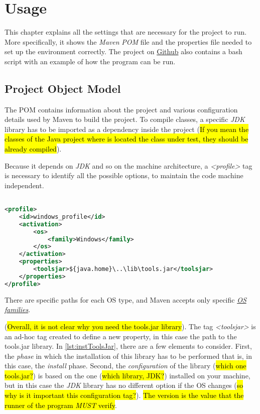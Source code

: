 \chapter{Usage}\label{ch:usage}

This chapter explains all the settings that are necessary for the project to run. More specifically, it shows the \textit{Maven} \textit{POM} file and the properties file needed to set up the environment correctly. The project on \href{\projRoot}{Github} also contains a bash script with an example of how the program can be run.

\section{Project Object Model}\label{sec:pom}

The POM contains information about the project and various configuration details used by Maven to build the project. To compile classes, a specific \emph{JDK} library has to be imported as a dependency inside the project (\hl{If you mean the classes of the Java project where is located the class under test, they should be already compiled}).

Because it depends on \emph{JDK} and so on the machine architecture, a \emph{<profile>} tag is necessary to identify all the possible options, to maintain the code machine independent.
\begin{lstlisting}[language=XML,caption={Windows default profile for jdk lib},label={lst:winToolsJar}]% Start your code-block

<profile>
	<id>windows_profile</id>
	<activation>
		<os>
			<family>Windows</family>
		</os>
	</activation>
	<properties>
		<toolsjar>${java.home}\..\lib\tools.jar</toolsjar>
	</properties>
</profile>
\end{lstlisting}

There are specific paths for each OS type, and Maven accepts only specific \href{http://maven.apache.org/enforcer/enforcer-rules/requireOS.html}{\textit{OS families}}.

(\hl{Overall, it is not clear why you need the tools.jar library}).
The tag \textit{<toolsjar>} is an ad-hoc tag created to define a new property, in this case the path to the tools.jar library. In \autoref{lst:instToolsJar}, there are a few elements to consider. First, the \textit{phase} in which the installation of this library has to be performed that is, in this case, the \textit{install} phase. Second, the \textit{configuration} of the library (\hl{which one tools.jar?}) is based on the one (\hl{which library, JDK?}) installed on your machine, but in this case the \emph{JDK} library has no different option if the OS changes (\hl{so why is it important this configuration tag?}). \hl{The version is the value that the runner of the program \emph{MUST} verify}.

